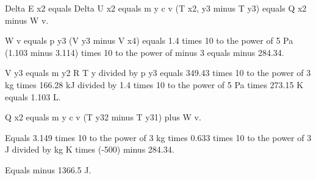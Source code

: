 Delta E x2 equals Delta U x2 equals m y c v (T x2, y3 minus T y3) equals Q x2 minus W v.

W v equals p y3 (V y3 minus V x4) equals 1.4 times 10 to the power of 5 Pa (1.103 minus 3.114) times 10 to the power of minus 3 equals minus 284.34.

V y3 equals m y2 R T y divided by p y3 equals 349.43 times 10 to the power of 3 kg times 166.28 kJ divided by 1.4 times 10 to the power of 5 Pa times 273.15 K equals 1.103 L.

Q x2 equals m y c v (T y32 minus T y31) plus W v.

Equals 3.149 times 10 to the power of 3 kg times 0.633 times 10 to the power of 3 J divided by kg K times (-500) minus 284.34.

Equals minus 1366.5 J.